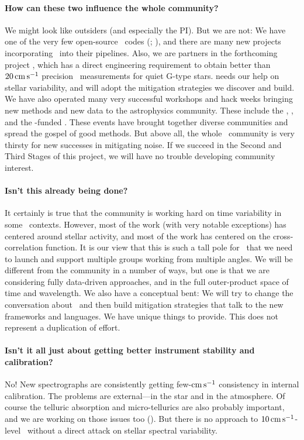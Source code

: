\documentclass[12pt, letterpaper]{article}
\begin{document}
\paragraph{How can these two influence the whole community?}
We might look like outsiders (and especially the PI).
But we are not: We have one of the very few open-source \EPRV\ codes
(\wobble; \citealt{Bedell2019}), and there are many new projects incorporating 
\wobble\ into their pipelines.
Also, we are partners in the forthcoming  project
, which has a direct engineering
requirement to obtain better than $20\,{\mathrm{cm\,s^{-1}}}$ precision
\RV\ measurements for quiet G-type stars.
 needs our help on stellar variability, and will adopt
the mitigation strategies we discover and build.
We have also operated many very successful workshops and hack weeks
bringing new methods and new data to the astrophysics community.
These include the , , and the \NASA-funded .
These events have brought together diverse communities and spread
the gospel of good methods.
But above all, the whole \EPRV\ community is very thirsty for new
successes in mitigating noise. If we succeed in the Second and Third
Stages of this project, we will have no trouble developing community
interest.

\paragraph{Isn't this already being done?}
It certainly is true that the community is working hard on time
variability in some \EPRV\ contexts.
However, most of the work (with very notable exceptions) has centered
around stellar activity, and most of the work has centered on the
cross-correlation function.
It is our view that this is such a tall pole for \EPRV\ that we need
to launch and support multiple groups working from multiple angles.
We will be different from the community in a number of ways, but one
is that we are considering fully data-driven approaches, and in the
full outer-product space of time and wavelength.
We also have a conceptual bent: We will try to change the conversation
about \EPRV\ and then build mitigation strategies that talk to the
new frameworks and languages.
We have unique things to provide.
This does not represent a duplication of effort.

\paragraph{Isn't it all just about getting better instrument stability and calibration?}
No! New spectrographs are consistently getting few-${\mathrm{cm\,s^{-1}}}$ consistency
in internal calibration.
The problems are external---in the star and in the atmosphere.
Of course the telluric absorption and micro-tellurics are also
probably important, and we are working on those issues too (\citealt{Bedell2019}).
But there is no approach to $10\,{\mathrm{cm\,s^{-1}}}$-level \EPRV\ without a direct
attack on stellar spectral variability.
\end{document}
